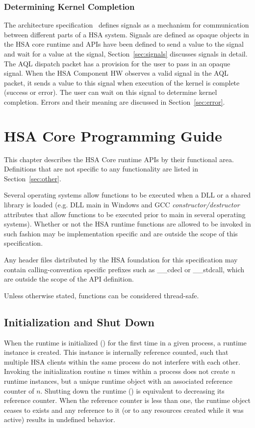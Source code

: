 \documentclass[final]{book}
\begin{document}
\subsection{Determining Kernel Completion}
The architecture specification~\cite{sar} defines signals as a mechanism for
communication between different parts of a HSA system. Signals are defined as
opaque objects in the HSA core runtime and APIs have been defined to send a
value to the signal and wait for a value at the signal,
Section~\ref{sec:signals} discusses signals in detail. The AQL dispatch packet
has a provision for the user to pass in an opaque signal. When the HSA Component
HW observes a valid signal in the AQL packet, it sends a value to this signal
when execution of the kernel is complete (success or error). The user can wait
on this signal to determine kernel completion. Errors and their meaning are
discussed in Section~\ref{sec:error}.



\chapter{HSA Core Programming Guide} \label{coreapi}

This chapter describes the HSA Core runtime APIs by their functional
area. Definitions that are not specific to any functionality are listed in
Section~\ref{sec:other}.

Several operating systems allow functions to be executed when a DLL or a shared
library is loaded (e.g. DLL main in Windows and GCC
\emph{constructor/destructor} attributes that allow functions to be executed
prior to main in several operating systems). Whether or not the HSA runtime
functions are allowed to be invoked in such fashion may be implementation
specific and are outside the scope of this specification.

Any header files distributed by the HSA foundation for this specification may
contain calling-convention specific prefixes such as __cdecl or __stdcall, which
are outside the scope of the API definition.

Unless otherwise stated, functions can be considered thread-safe.

\section{Initialization and Shut Down}\label{sec:init}
When the runtime is initialized () for the first time in a
given process, a runtime instance is created. This instance is internally
reference counted, such that multiple HSA clients within the same process do not
interfere with each other. Invoking the initialization routine $n$ times within
a process does not create $n$ runtime instances, but a unique runtime object
with an associated reference counter of $n$. Shutting down the runtime
() is equivalent to decreasing its reference counter. When
the reference counter is less than one, the runtime object ceases to exists and
any reference to it (or to any resources created while it was active) results in
undefined behavior.
\end{document}
